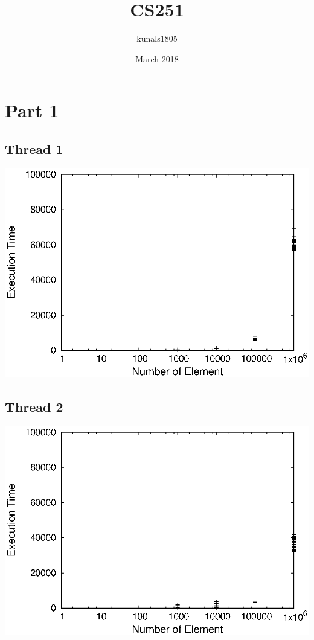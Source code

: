 \documentclass{article}
\title{CS251}
\author{kunals1805 }
\date{March 2018}
\begin{document}
\maketitle

\section{Part 1}
\subsection{Thread 1}
\includegraphics{partA_t1}
\subsection{Thread 2}
\includegraphics{partA_t2}
\end{document}
